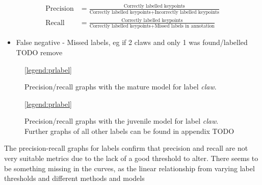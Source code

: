 \begin{align}
\text{Precision} &= \frac{\text{Correctly labelled keypoints}}{\text{Correctly labelled keypoints} + \text{Incorrectly labelled keypoints}}
\\[10pt]
\text{Recall} &= \frac{\text{Correctly labelled keypoints}}{\text{Correctly labelled keypoints} + \text{Missed labels in annotation}}
\end{align}

\begin{itemize}
\item False negative - Missed labels, eg if 2 claws and only 1 was found/labelled TODO remove
\end{itemize}



\begin{figure}[H]
\centering
{}
\ref{legend:prlabel}
\caption{Precision/recall graphs with the mature model for label \textit{claw}.}
\end{figure}

\begin{figure}[H]
\centering
{}
\ref{legend:prlabel}
\caption{Precision/recall graphs with the juvenile model for label \textit{claw}. Further graphs of all other labels can be found in appendix TODO}
\end{figure}
\noindent
The precision-recall graphs for labels confirm that precision and recall are not very suitable metrics due to the lack of a good threshold to alter. There seems to be something missing in the curves, as the linear relationship from varying label thresholds and different methods and models 
\n


%
%
%

